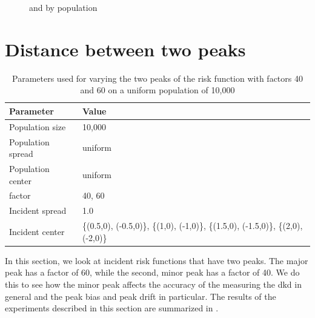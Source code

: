 \begin{figure}[htbp]
\begin{subfigure}[t]{0.49\textwidth}
        \label{fig:other_measures:pop_spread:maxerr}
    \end{subfigure}
    \caption{ and  by population }
    \label{fig:other_measures:pop_spread}
\end{figure}

\section{Distance between two peaks}
\label{sec:results:p1.4_100_G}

\begin{table}[htbp]
    \centering
    \begin{tabular}{ll}
        \toprule
        Parameter & Value \\
        \midrule
        Population size & 10,000 \\
        Population \gls{spread} & uniform \\
        Population center & uniform \\
        \Gls{factor} & 40, 60 \\
        Incident \gls{spread} & 1.0 \\
        Incident center & \{(0.5,0), (-0.5,0)\},  \{(1,0), (-1,0)\}, \{(1.5,0), (-1.5,0)\}, \{(2,0), (-2,0)\}\\
        \bottomrule
    \end{tabular}
    \caption{Parameters used for varying the two peaks of the risk function with \glspl{factor} 40 and 60 on a uniform population of 10,000}
    \label{tab:params:p1.4_100_G}
\end{table}

In this section, we look at incident risk functions that have two peaks.
The major peak has a \gls{factor} of 60, while the second, minor peak has a \gls{factor} of 40.
We do this to see how the minor peak affects the accuracy of the measuring the \gls{dkd} in general and the \gls{peak bias} and \gls{peak drift} in particular.
The results of the experiments described in this section are summarized in .

